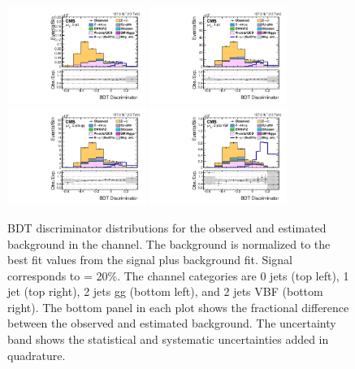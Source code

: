 \begin{figure}[htbp!]
  \centering
  \includegraphics[width=0.4\textwidth]{plots/chapter9/BDT/mutau/0jet.pdf}
  \includegraphics[width=0.4\textwidth]{plots/chapter9/BDT/mutau/1jet.pdf} \\
  \includegraphics[width=0.4\textwidth]{plots/chapter9/BDT/mutau/2jet_gg.pdf}
  \includegraphics[width=0.4\textwidth]{plots/chapter9/BDT/mutau/2jet_vbf.pdf} \\
  \caption{BDT discriminator distributions for the observed and estimated background in the \muhad channel. The background is normalized to the best fit values from the signal plus background fit. Signal corresponds to \BHmt = 20\%. The \muhad channel categories are 0 jets (top left), 1 jet (top right), 2 jets gg (bottom left), and 2 jets VBF (bottom right). The bottom panel in each plot shows the fractional difference between the observed and estimated background. The uncertainty band shows the statistical and systematic uncertainties added in quadrature.}
  \label{fig:bdt_muhad}
\end{figure}

